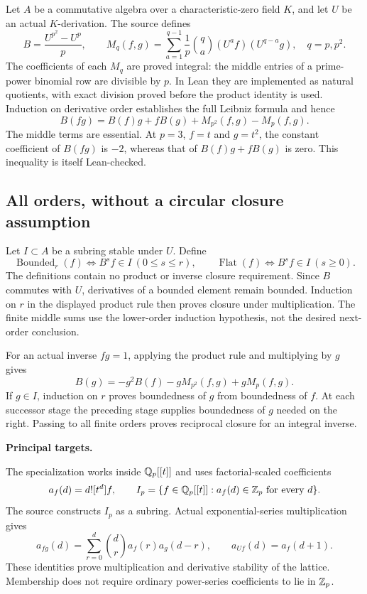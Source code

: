 \par\medskip
{}
Let $A$ be a commutative algebra over a characteristic-zero field $K$, and let $U$ be an actual $K$-derivation. The source defines
\[
 B=\frac{U^{p^2}-U^p}{p},\qquad
 M_q(f,g)=\sum_{a=1}^{q-1}\frac{1}{p}\binom qa
          (U^a f)(U^{q-a}g),\quad q=p,p^2.
\]
The coefficients of each $M_q$ are proved integral: the middle entries of a prime-power binomial row are divisible by $p$. In Lean they are implemented as natural quotients, with exact division proved before the product identity is used. Induction on derivative order establishes the full Leibniz formula and hence
\[
\boxed{B(fg)=B(f)g+fB(g)+M_{p^2}(f,g)-M_p(f,g).}
\]
The middle terms are essential. At $p=3$, $f=t$ and $g=t^2$, the constant coefficient of $B(fg)$ is $-2$, whereas that of $B(f)g+fB(g)$ is zero. This inequality is itself Lean-checked.

\subsection*{All orders, without a circular closure assumption}
Let $I\subset A$ be a subring stable under $U$. Define
\[
 \operatorname{Bounded}_r(f)\iff B^s f\in I\ (0\le s\le r),
 \qquad \operatorname{Flat}(f)\iff B^s f\in I\ (s\ge0).
\]
The definitions contain no product or inverse closure requirement. Since $B$ commutes with $U$, derivatives of a bounded element remain bounded. Induction on $r$ in the displayed product rule then proves closure under multiplication. The finite middle sums use the lower-order induction hypothesis, not the desired next-order conclusion.

For an actual inverse $fg=1$, applying the product rule and multiplying by $g$ gives
\[
 B(g)=-g^2B(f)-gM_{p^2}(f,g)+gM_p(f,g).
\]
If $g\in I$, induction on $r$ proves boundedness of $g$ from boundedness of $f$. At each successor stage the preceding stage supplies boundedness of $g$ needed on the right. Passing to all finite orders proves reciprocal closure for an integral inverse.

\textbf{Principal targets.}\par
{}\par
{}\par
{}

\par\medskip
{}
The specialization works inside $\mathbb Q_p[[t]]$ and uses factorial-scaled coefficients
\[
 a_f(d)=d![t^d]f,\qquad
 I_p=\{f\in\mathbb Q_p[[t]]:a_f(d)\in\mathbb Z_p\text{ for every }d\}.
\]
The source constructs $I_p$ as a subring. Actual exponential-series multiplication gives
\[
 a_{fg}(d)=\sum_{r=0}^{d}\binom dr a_f(r)a_g(d-r),
 \qquad a_{Uf}(d)=a_f(d+1).
\]
These identities prove multiplication and derivative stability of the lattice. Membership does not require ordinary power-series coefficients to lie in $\mathbb Z_p$.

